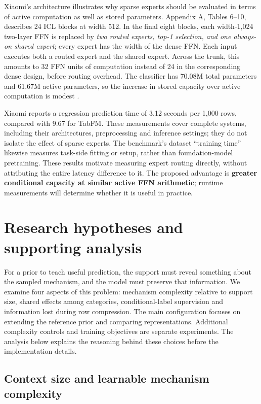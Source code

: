 \documentclass[11pt]{article}
\begin{document}
Xiaomi's architecture illustrates why sparse experts should be evaluated in terms of active computation as well as stored parameters. Appendix A, Tables 6--10, describes 24 ICL blocks at width 512. In the final eight blocks, each width-1,024 two-layer FFN is replaced by \emph{two routed experts, top-1 selection, and one always-on shared expert}; every expert has the width of the dense FFN. Each input executes both a routed expert and the shared expert. Across the trunk, this amounts to 32 FFN units of computation instead of 24 in the corresponding dense design, before routing overhead. The classifier has 70.08M total parameters and 61.67M active parameters, so the increase in stored capacity over active computation is modest \cite{xiaomi}.

Xiaomi reports a regression prediction time of 3.12 seconds per 1,000 rows, compared with 9.67 for TabFM. These measurements cover complete systems, including their architectures, preprocessing and inference settings; they do not isolate the effect of sparse experts. The benchmark's dataset ``training time'' likewise measures task-side fitting or setup, rather than foundation-model pretraining. These results motivate measuring expert routing directly, without attributing the entire latency difference to it. The proposed advantage is \textbf{greater conditional capacity at similar active FFN arithmetic}; runtime measurements will determine whether it is useful in practice.



\section{Research hypotheses and supporting analysis}
\label{sec:edge}

For a prior to teach useful prediction, the support must reveal something about the sampled mechanism, and the model must preserve that information. We examine four aspects of this problem: mechanism complexity relative to support size, shared effects among categories, conditional-label supervision and information lost during row compression. The main configuration focuses on extending the reference prior and comparing representations. Additional complexity controls and training objectives are separate experiments. The analysis below explains the reasoning behind these choices before the implementation details.

\subsection{Context size and learnable mechanism complexity}
\label{sec:learnability}
\end{document}
